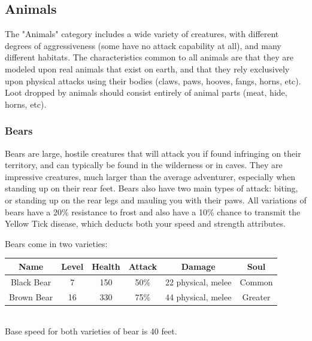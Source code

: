 \documentclass[12pt]{book}
\begin{document}
\subsection{Animals}
The "Animals" category includes a wide variety of creatures, with different degrees of aggressiveness (some have no attack capability at all), and many different habitats. The characteristics common to all animals are that they are modeled upon real animals that exist on earth, and that they rely exclusively upon physical attacks using their bodies (claws, paws, hooves, fangs, horns, etc). Loot dropped by animals should consist entirely of animal parts (meat, hide, horns, etc).

\subsubsection{Bears}
Bears are large, hostile creatures that will attack you if found infringing on their territory, and can typically be found in the wilderness or in caves. They are impressive creatures, much larger than the average adventurer, especially when standing up on their rear feet. Bears also have two main types of attack: biting, or standing up on the rear legs and mauling you with their paws. All variations of bears have a 20\% resistance to frost and also have a 10\% chance to transmit the Yellow Tick disease, which deducts both your speed and strength attributes.

Bears come in two varieties:\\

\begin{tabular}{|c|c|c|c|c|c|}
\hline
Name & Level & Health & Attack & Damage & Soul\\ \hline
Black Bear & 7 & 150 & 50\% & 22 physical, melee & Common\\ \hline
Brown Bear & 16 & 330 & 75\% & 44 physical, melee & Greater\\ \hline
\end{tabular}\\

Base speed for both varieties of bear is 40 feet.
\end{document}
